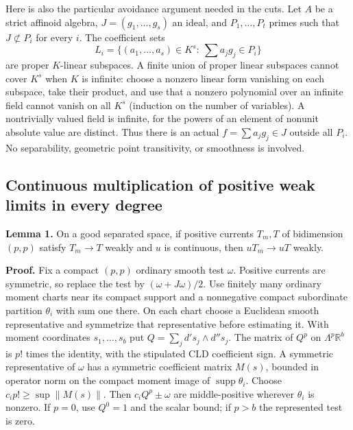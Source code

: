 \documentclass[
  10pt,
]{article}
\begin{document}
Here is also the particular avoidance argument needed in the cuts. Let
\(A\) be a strict affinoid algebra, \(J=(g_1,\ldots,g_s)\) an ideal, and
\(P_1,\ldots,P_t\) primes such that \(J\not\subset P_i\) for every
\(i\). The coefficient sets \[
 L_i=\{(a_1,\ldots,a_s)\in K^s:\ \textstyle\sum a_jg_j\in P_i\}
\] are proper \(K\)-linear subspaces. A finite union of proper linear
subspaces cannot cover \(K^s\) when \(K\) is infinite: choose a nonzero
linear form vanishing on each subspace, take their product, and use that
a nonzero polynomial over an infinite field cannot vanish on all \(K^s\)
(induction on the number of variables). A nontrivially valued field is
infinite, for the powers of an element of nonunit absolute value are
distinct. Thus there is an actual \(f=\sum a_jg_j\in J\) outside all
\(P_i\). No separability, geometric point transitivity, or smoothness is
involved.

\subsection{Continuous multiplication of positive weak limits in every
degree}\label{continuous-multiplication-of-positive-weak-limits-in-every-degree}

\textbf{Lemma 1.} On a good separated space, if positive currents
\(T_m,T\) of bidimension \((p,p)\) satisfy \(T_m\to T\) weakly and \(u\)
is continuous, then \(uT_m\to uT\) weakly.

\textbf{Proof.} Fix a compact \((p,p)\) ordinary smooth test \(\omega\).
Positive currents are symmetric, so replace the test by
\((\omega+J\omega)/2\). Use finitely many ordinary moment charts near
its compact support and a nonnegative compact subordinate partition
\(\theta_i\) with sum one there. On each chart choose a Euclidean smooth
representative and symmetrize that representative before estimating it.
With moment coordinates \(s_1,\ldots,s_b\) put
\(Q=\sum_jd's_j\wedge d''s_j\). The matrix of \(Q^p\) on
\(\Lambda^p\mathbb R^b\) is \(p!\) times the identity, with the
stipulated CLD coefficient sign. A symmetric representative of
\(\omega\) has a symmetric coefficient matrix \(M(s)\), bounded in
operator norm on the compact moment image of
\(\operatorname{supp}\theta_i\). Choose \(c_ip!\geq\sup\|M(s)\|\). Then
\(c_iQ^p\pm\omega\) are middle-positive wherever \(\theta_i\) is
nonzero. If \(p=0\), use \(Q^0=1\) and the scalar bound; if \(p>b\) the
represented test is zero.
\end{document}
